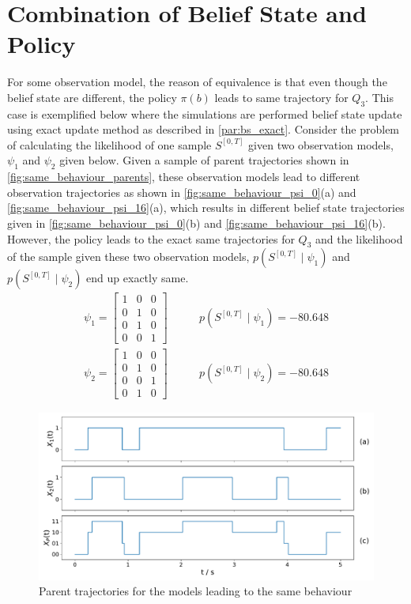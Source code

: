 \section*{Combination of Belief State and Policy}
\label{ap:eq_classes_same_behaviour}
For some observation model, the reason of equivalence is that even though the belief state are different, the policy $ \pi(b) $ leads to same trajectory for $ Q_3 $. This case is exemplified below where the simulations are performed belief state update using exact update method as described in \cref{par:bs_exact}. Consider the problem of calculating the likelihood of one sample $ S^{[0,T]} $ given two observation models, $ \psi_1 $ and $ \psi_2 $ given below. Given a sample of parent trajectories shown in \autoref{fig:same_behaviour_parents}, these observation models lead to different observation trajectories as shown in \autoref{fig:same_behaviour_psi_0}(a) and \autoref{fig:same_behaviour_psi_16}(a), which results in different belief state trajectories given in \autoref{fig:same_behaviour_psi_0}(b) and \autoref{fig:same_behaviour_psi_16}(b). However, the policy leads to the exact same trajectories for $ Q_3 $ and the likelihood of the sample given these two observation models, $ p(S^{[0,T]} \mid \psi_1 ) $ and $ p(S^{[0,T]} \mid \psi_2 ) $ end up exactly same.
\begin{align}
\psi_{1} =
\begin{bmatrix}
1 & 0 & 0 \\
0 & 1 & 0 \\
0 & 1 & 0 \\
0 & 0 & 1
\end{bmatrix} &\quad \quad
p(S^{[0,T]} \mid \psi_1 ) = -80.648 \label{eq:psi_1_1}\\
\psi_{2} =
\begin{bmatrix}
1 & 0 & 0 \\
0 & 1 & 0 \\
0 & 0 & 1 \\
0 & 1 & 0 
\end{bmatrix} &\quad \quad
p(S^{[0,T]} \mid \psi_2 ) = -80.648
\label{eq:psi_16}
\end{align}
\begin{figure}[H]
	\begin{center}
		\includegraphics[width=.90\textwidth]{figures/equivalence_classes/same_behaviour/parent_traj}
		\caption[Parent trajectories for the models leading to the same belief state]{Parent trajectories for the models leading to the same behaviour}
		\label{fig:same_behaviour_parents}
	\end{center}
\end{figure}
